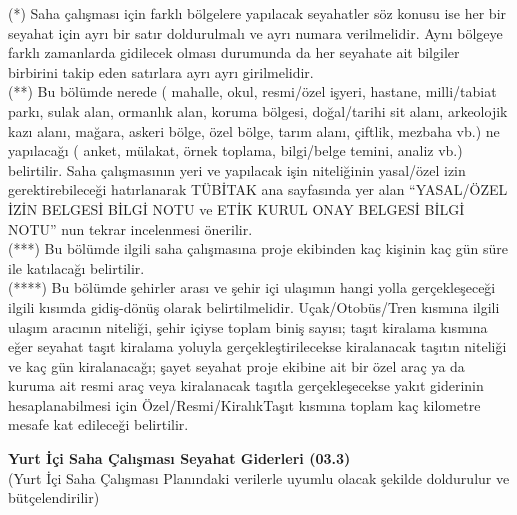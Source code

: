 {\footnotesize
\noindent (*) Saha çalışması için farklı bölgelere yapılacak seyahatler söz konusu ise her bir seyahat için ayrı bir satır doldurulmalı ve ayrı numara verilmelidir. Aynı bölgeye farklı zamanlarda gidilecek olması durumunda da her seyahate ait bilgiler birbirini takip eden satırlara ayrı ayrı girilmelidir.\\
\noindent (**) Bu bölümde nerede ( mahalle, okul, resmi/özel işyeri, hastane, milli/tabiat parkı, sulak alan, ormanlık alan, koruma bölgesi, doğal/tarihi sit alanı, arkeolojik kazı alanı, mağara, askeri bölge, özel bölge, tarım alanı, çiftlik, mezbaha vb.) ne yapılacağı ( anket, mülakat, örnek toplama, bilgi/belge temini, analiz vb.) belirtilir. Saha çalışmasının yeri ve yapılacak işin niteliğinin yasal/özel izin gerektirebileceği hatırlanarak TÜBİTAK ana sayfasında yer alan ``YASAL/ÖZEL İZİN BELGESİ BİLGİ NOTU ve ETİK KURUL ONAY BELGESİ BİLGİ NOTU'' nun tekrar incelenmesi önerilir.\\
\noindent (***) Bu bölümde ilgili saha çalışmasına proje ekibinden kaç kişinin kaç gün süre ile katılacağı belirtilir. \\
\noindent (****) Bu bölümde şehirler arası ve şehir içi ulaşımın hangi yolla gerçekleşeceği ilgili kısımda gidiş-dönüş olarak belirtilmelidir. Uçak/Otobüs/Tren kısmına ilgili ulaşım aracının niteliği, şehir içiyse toplam biniş sayısı; taşıt kiralama kısmına eğer seyahat taşıt kiralama yoluyla gerçekleştirilecekse kiralanacak taşıtın niteliği ve kaç gün kiralanacağı; şayet seyahat proje ekibine ait bir özel araç ya da kuruma ait resmi araç veya kiralanacak taşıtla gerçekleşecekse yakıt giderinin hesaplanabilmesi için Özel/Resmi/KiralıkTaşıt kısmına toplam kaç kilometre mesafe kat edileceği belirtilir. 
}


\begin{center}
\textbf{Yurt İçi Saha Çalışması Seyahat Giderleri (03.3)}\\
(Yurt İçi Saha Çalışması Planındaki verilerle uyumlu olacak şekilde doldurulur ve bütçelendirilir)    
\end{center}

